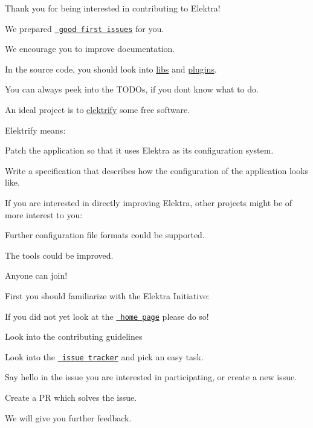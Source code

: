 Thank you for being interested in contributing to Elektra!

We prepared \href{https://github.com/ElektraInitiative/libelektra/issues?q=is%3Aissue+is%3Aopen+label%3A%22good+first+issue%22}{\texttt{ good first issues}} for you.


\begin{DoxyItemize}
\item We encourage you to improve documentation.
\item In the source code, you should look into \mbox{\hyperlink{src_libs_README_md}{libs}} and \mbox{\hyperlink{src_plugins_README_md}{plugins}}.
\item You can always peek into the T\+O\+D\+Os, if you don\textquotesingle{}t know what to do.
\item An ideal project is to \mbox{\hyperlink{doc_help_elektra-glossary_md}{elektrify}} some free software.
\end{DoxyItemize}

Elektrify means\+:


\begin{DoxyItemize}
\item Patch the application so that it uses Elektra as its configuration system.
\item Write a specification that describes how the configuration of the application looks like.
\end{DoxyItemize}

If you are interested in directly improving Elektra, other projects might be of more interest to you\+:


\begin{DoxyItemize}
\item Further configuration file formats could be supported.
\item The tools could be improved.
\end{DoxyItemize}

Anyone can join!

First you should familiarize with the Elektra Initiative\+:


\begin{DoxyItemize}
\item If you did not yet look at the \href{https://www.libelektra.org/}{\texttt{ home page}} please do so!
\item Look into the contributing guidelines
\item Look into the \href{https://issues.libelektra.org/}{\texttt{ issue tracker}} and pick an easy task.
\item Say hello in the issue you are interested in participating, or create a new issue.
\item Create a PR which solves the issue.
\item We will give you further feedback. 
\end{DoxyItemize}